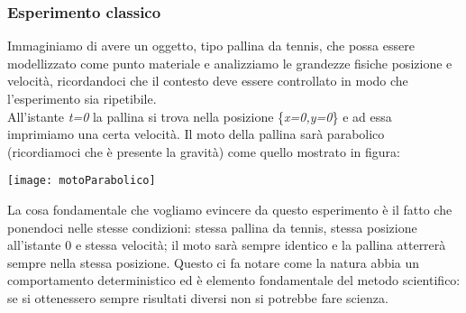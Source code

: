 \subsubsection{Esperimento classico}
Immaginiamo di avere un oggetto, tipo pallina da tennis, che possa essere modellizzato come punto materiale e analizziamo le grandezze fisiche posizione e velocità, ricordandoci che il contesto deve essere controllato in modo che l'esperimento sia ripetibile.\\
All'istante \textit{t=0} la pallina si trova nella posizione \{\textit{x=0,y=0}\} e ad essa imprimiamo una certa velocità. Il moto della pallina sarà parabolico (ricordiamoci che è presente la gravità) come quello mostrato in figura:\\
\begin{center} \texttt{[image: motoParabolico]} \end{center}
La cosa fondamentale che vogliamo evincere da questo esperimento è il fatto che ponendoci nelle stesse condizioni: stessa pallina da tennis, stessa posizione all'istante 0 e stessa velocità; il moto sarà sempre identico e la pallina atterrerà sempre nella stessa posizione. Questo ci fa notare come la natura abbia un comportamento deterministico ed è elemento fondamentale del metodo scientifico: se si ottenessero sempre risultati diversi non si potrebbe fare scienza.
